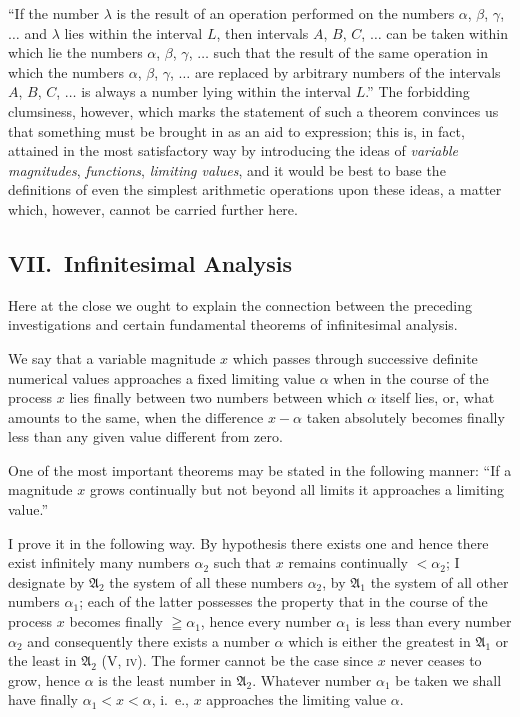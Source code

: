 \documentclass[polutonikogreek,english,twoside,openright]{article}
\begin{document}
``If the number $\lambda$ is the result of an operation performed on
the numbers $\alpha$, $\beta$, $\gamma$, $\ldots$ and $\lambda$ lies
within the interval $L$, then intervals $A$, $B$, $C$, $\ldots$ can be
taken within which lie the numbers $\alpha$, $\beta$, $\gamma$,
$\ldots$ such that the result of the same operation in which the
numbers $\alpha$, $\beta$, $\gamma$, $\ldots$ are replaced by
arbitrary numbers of the intervals $A$, $B$, $C$, $\ldots$ is always a
number lying within the interval $L$.'' The forbidding clumsiness,
however, which marks the statement of such a theorem convinces us that
something must be brought in as an aid to expression; this is, in
fact, attained in the most satisfactory way by introducing the ideas
of \textit{variable magnitudes}, \textit{functions}, \textit{limiting
  values}, and it would be best to base the definitions of even the
simplest arithmetic operations upon these ideas, a matter which,
however, cannot be carried further here.

\subsection*{VII.\ Infinitesimal Analysis}

Here at the close we ought to explain the connection between the
preceding investigations and certain fundamental theorems of
infinitesimal analysis.

We say that a variable magnitude $x$ which passes through successive
definite numerical values approaches a fixed limiting value $\alpha$
when in the course of the process $x$ lies finally between two numbers
between which $\alpha$ itself lies, or, what amounts to the same, when
the difference $x-\alpha$ taken absolutely becomes finally less than
any given value different from zero.

One of the most important theorems may be stated in the following
manner: ``If a magnitude $x$ grows continually but not beyond all
limits it approaches a limiting value.''

I prove it in the following way. By hypothesis there exists one and
hence there exist infinitely many numbers $\alpha_2$ such that $x$
remains continually $<\alpha_2$; I designate by $\mathfrak{A}_2$ the
system of all these numbers $\alpha_2$, by $\mathfrak{A}_1$ the system
of all other numbers $\alpha_1$; each of the latter possesses the
property that in the course of the process $x$ becomes finally
$\geqq \alpha_1$, hence every number $\alpha_1$ is less than every
number $\alpha_2$ and consequently there exists a number $\alpha$
which is either the greatest in $\mathfrak{A}_1$ or the least in
$\mathfrak{A}_2$ (V, \textsc{iv}). The former cannot be the case since
$x$ never ceases to grow, hence $\alpha$ is the least number in
$\mathfrak{A}_2$. Whatever number $\alpha_1$ be taken we shall have
finally $\alpha_1<x<\alpha$, i.~e., $x$ approaches the limiting value
$\alpha$.
\end{document}
